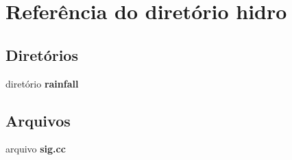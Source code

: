\section{Referência do diretório hidro}
\label{dir_b24450f928672ca131f77e8b11427d02}
\subsection*{Diretórios}
\begin{DoxyCompactItemize}
\item 
diretório {\bf rainfall}
\end{DoxyCompactItemize}
\subsection*{Arquivos}
\begin{DoxyCompactItemize}
\item 
arquivo {\bf sig.\+cc}
\end{DoxyCompactItemize}
